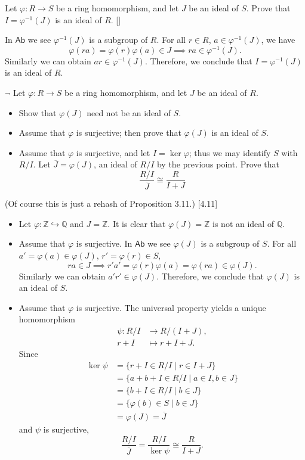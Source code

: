 \documentclass[12pt,letterpaper,boxed]{hmcpset}
\newcommand{\Ab}{\mathsf{Ab}}
\newcommand{\Q}{\mathbb{Q}}
\newcommand{\Z}{\mathbb{Z}}
\begin{document}
\hypertarget{Exercise III.3.2}{}
\begin{problem}[3.2]
Let $\varphi: R\to S$ be a ring homomorphism, and let $J$ be an ideal of $S$. Prove
that $I = \varphi^{-1}(J)$ is an ideal of $R$. []
\end{problem}
\begin{solution}
In $\Ab$ we see $\varphi^{-1}(J)$ is a subgroup of $R$. For all $r\in R$, $a\in \varphi^{-1}(J)$, we have
\[
\varphi(ra)=\varphi(r)\varphi(a)\in J\implies ra\in\varphi^{-1}(J).
\]
Similarly we can obtain $ar\in\varphi^{-1}(J)$. Therefore, we conclude that $I = \varphi^{-1}(J)$ is an ideal of $R$.
\end{solution}

\hypertarget{Exercise III.3.3}{}
\begin{problem}[3.3]
$\neg$ Let $\varphi : R \to S$ be a ring homomorphism, and let $J$ be an ideal of $R$.
\begin{itemize}
	\item Show that $\varphi(J)$ need not be an ideal of $S$.
	\item Assume that $\varphi$ is surjective; then prove that $\varphi(J)$ is an ideal of $S$.
	\item Assume that $\varphi$ is surjective, and let $I = \ker\varphi$; thus we may identify $S$ with $R/I$.
	Let $\overline{J}= \varphi(J)$, an ideal of $R/I$ by the previous point. Prove that
	\[
	\frac{R / I}{\overline{J}} \cong \frac{R}{I+J}
	\]
\end{itemize}
(Of course this is just a rehash of Proposition 3.11.) [4.11]
\end{problem}
\begin{solution}
\begin{itemize}
	\item Let $\varphi:\Z\hookrightarrow \Q$ and $J=\Z$. It is clear that $\varphi(J)=\Z$ is not an ideal of $\Q$.
	\item Assume that $\varphi$ is surjective. In $\Ab$ we see $\varphi(J)$ is a subgroup of $S$. For all $a'=\varphi(a)\in\varphi(J)$, $r'=\varphi(r)\in S$,
	\[
	ra\in J\implies r'a'=\varphi(r)\varphi(a)=\varphi(ra)\in\varphi(J).
	\]
	Similarly we can obtain $a'r'\in\varphi(J)$. Therefore, we conclude that $\varphi(J)$ is an ideal of $S$.
	\item Assume that $\varphi$ is surjective. The universal property yields a unique homomorphism
	\begin{align*}
	\psi:R/I&\longrightarrow R/(I+J),\\
	r+I &\longmapsto r+I+J.
	\end{align*}
	Since
	\begin{align*}
	\ker \psi&=\{r+I\in R/I\mid r\in I+J\}\\
	&=\{a+b+I\in R/I\mid a\in I,b\in J\}\\
	&=\{b+I\in R/I\mid b\in J\}\\
	&=\{\varphi(b)\in S\mid b\in J\}\\
	&= \varphi(J)=\overline{J}
	\end{align*}
	and $\psi$ is surjective,
	\[
	\frac{R / I}{\overline{J}}=\frac{R / I}{\ker \psi} \cong \frac{R}{I+J}.
	\]
\end{itemize}
\end{solution}
\end{document}

